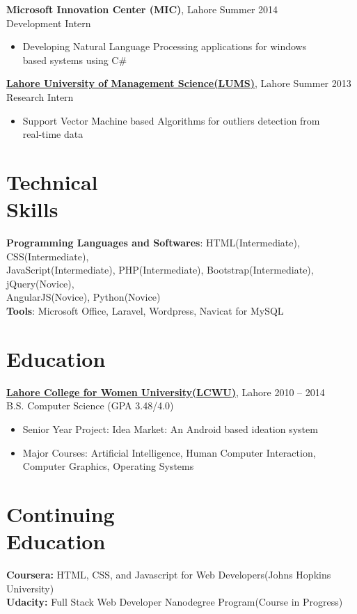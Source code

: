\documentclass[margin,line]{res}
\begin{document}
\begin{resume}
\begin{itemize}
 \end{itemize}
{\bf Microsoft Innovation Center (MIC)}, Lahore \hfill 
Summer 2014\\
 Development Intern
\begin{itemize} \itemsep -2pt  %
 \item Developing Natural Language Processing applications for windows\\based systems using C\# 
 \end{itemize}
  \href{https://lums.edu.pk/}{\bf Lahore University of Management Science(LUMS)}, Lahore \hfill Summer 2013
\\Research Intern
\begin{itemize} \itemsep -2pt  %
 \item Support Vector Machine based Algorithms for outliers detection from\\real-time data 
 \end{itemize}


\section{Technical \\Skills}
{\bf Programming Languages and Softwares}: HTML(Intermediate), CSS(Intermediate),\\  JavaScript(Intermediate), PHP(Intermediate), Bootstrap(Intermediate), jQuery(Novice), \\AngularJS(Novice), Python(Novice)
\\{\bf Tools}: Microsoft Office, Laravel, Wordpress, Navicat for MySQL

\section{Education} 
\href{http://www.lcwu.edu.pk/}{\bf Lahore College for Women University(LCWU)}, Lahore \hfill 2010 -- 2014\\ B.S. Computer Science \hfill(GPA 3.48/4.0)
\begin{itemize} \itemsep -2pt  %
 \item Senior Year Project: Idea Market: An Android based ideation system
 \item  Major Courses: Artificial Intelligence, Human Computer Interaction,\\ Computer Graphics, Operating Systems 
 \end{itemize}

\section{Continuing \\Education}
{\bf Coursera:} HTML, CSS, and Javascript for Web Developers(Johns Hopkins University)\\
{\bf Udacity:} Full Stack Web Developer Nanodegree Program(Course in Progress)


\end{resume}
\end{document}
